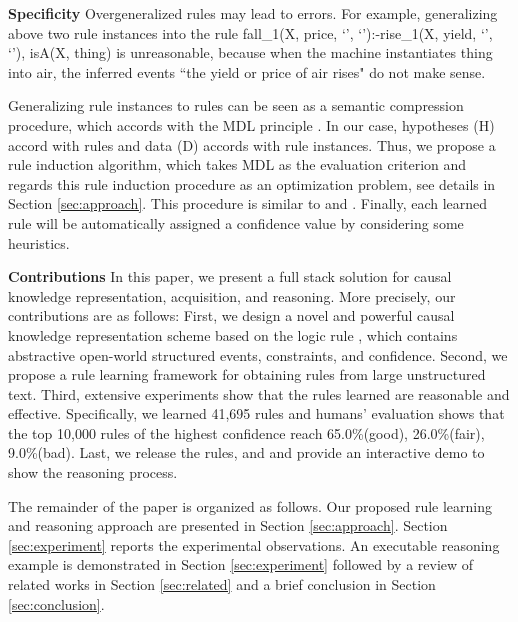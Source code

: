 \textbf{Specificity} Overgeneralized  rules may lead to errors. For example, generalizing above two rule instances into the rule fall\_1(X, price, `', `'):-rise\_1(X, yield, `', `'), isA(X, thing) is unreasonable, because when the machine instantiates thing into air, the inferred events ``the yield or price of air rises" do not make sense.

Generalizing rule instances to rules can be seen as a semantic compression procedure, which accords with the MDL principle \cite{rissanen1978mdl}. In our case, hypotheses (H) accord with rules and data (D) accords with rule instances. Thus, we propose a rule induction algorithm, which takes MDL as the evaluation criterion and regards this rule induction procedure as an optimization problem, see details in Section \ref{sec:approach}. This procedure is similar to \cite{Cui2016} and \cite{Zhu}. Finally, each learned rule will be automatically assigned a confidence value by considering some heuristics.
	
\textbf{Contributions}
In this paper, we present a full stack solution for causal knowledge representation, acquisition, and reasoning. More precisely, our contributions are as follows:
First, we design a novel and powerful causal knowledge representation scheme based on the logic rule , which contains abstractive open-world structured events, constraints, and confidence.
Second, we propose a rule learning framework for obtaining rules from large unstructured text.
Third, extensive experiments show that the rules learned are reasonable and effective. 
Specifically, we learned 41,695 rules and humans' evaluation shows that the top 10,000 rules of the highest confidence reach 65.0\%(good), 26.0\%(fair), 9.0\%(bad). Last, we release the rules, \zhpro and \zhcon and provide an interactive demo to show the reasoning process.
	
The remainder of the paper is organized as follows. Our proposed rule learning and reasoning approach are presented in Section \ref{sec:approach}. Section \ref{sec:experiment} reports the experimental observations. An executable reasoning example is demonstrated in Section \ref{sec:experiment} followed by a review of related works in Section \ref{sec:related} and a brief conclusion in Section \ref{sec:conclusion}.

%	
	
